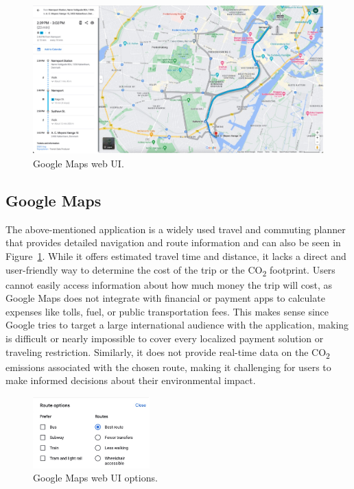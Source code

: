 \begin{figure}
    \centering
    \includegraphics[width=\textwidth]{images/google-maps}
    \caption{Google Maps web UI.}
    \label{fig:figure6}
\end{figure}

\subsection{Google Maps}\label{subsec:google-maps}

The above-mentioned application is a widely used travel and commuting planner that provides detailed navigation and
route information and can also be seen in Figure~\ref{fig:figure6}.
While it offers estimated travel time and distance, it lacks a direct and user-friendly way to determine the cost of the
trip or the \unit{CO_{2}} footprint.
Users cannot easily access information about how much money the trip will cost, as Google Maps does not integrate with
financial or payment apps to calculate expenses like tolls, fuel, or public transportation fees.
This makes sense since Google tries to target a large international audience with the application, making is difficult
or nearly impossible to cover every localized payment solution or traveling restriction.
Similarly, it does not provide real-time data on the \unit{CO_{2}} emissions associated with the chosen route, making it
challenging for users to make informed decisions about their environmental impact.

\begin{figure}
    \begin{center}
        \includegraphics[width=0.4\textwidth]{images/google-maps-options}
    \end{center}
    \caption{Google Maps web UI options.}
    \label{fig:figure7}
\end{figure}

